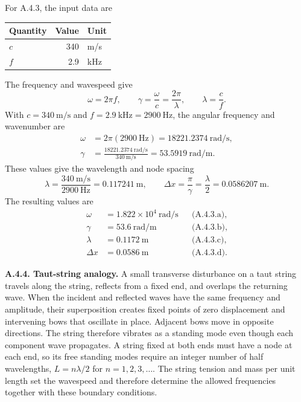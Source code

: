 For A.4.3, the input data are
\begin{center}\small
\begin{tabular}{@{}lrl@{}}
\toprule\noalign{}
Quantity & Value & Unit \\
\midrule\noalign{}
$c$ & 340 & m/s \\
$f$ & 2.9 & kHz \\
\bottomrule
\end{tabular}
\end{center}
The frequency and wavespeed give
\[
\omega=2\pi f,\qquad \gamma=\frac{\omega}{c}=\frac{2\pi}{\lambda},\qquad \lambda=\frac{c}{f}.
\]
With $c=340\ \mathrm{m/s}$ and $f=2.9\ \mathrm{kHz}=2900\ \mathrm{Hz}$, the angular frequency and wavenumber are
\[
\begin{aligned}
\omega&=2\pi(2900\ \mathrm{Hz})=18221.2374\ \mathrm{rad/s},\\
\gamma&=\frac{18221.2374\ \mathrm{rad/s}}{340\ \mathrm{m/s}}=53.5919\ \mathrm{rad/m}.
\end{aligned}
\]
These values give the wavelength and node spacing
\[
\lambda=\frac{340\ \mathrm{m/s}}{2900\ \mathrm{Hz}}=0.117241\ \mathrm{m},\qquad
\Delta x=\frac{\pi}{\gamma}=\frac{\lambda}{2}=0.0586207\ \mathrm{m}.
\]
The resulting values are
\[\boxed{\begin{aligned}
\omega&=1.822\times10^4\ \mathrm{rad/s} &&\text{(A.4.3.a)},\\
\gamma&=53.6\ \mathrm{rad/m} &&\text{(A.4.3.b)},\\
\lambda&=0.1172\ \mathrm{m} &&\text{(A.4.3.c)},\\
\Delta x&=0.0586\ \mathrm{m} &&\text{(A.4.3.d)}.
\end{aligned}}\]

\textbf{A.4.4. Taut-string analogy.} A small transverse disturbance on a taut string travels along the string, reflects from a fixed end, and overlaps the returning wave. When the incident and reflected waves have the same frequency and amplitude, their superposition creates fixed points of zero displacement and intervening bows that oscillate in place. Adjacent bows move in opposite directions. The string therefore vibrates as a standing mode even though each component wave propagates. A string fixed at both ends must have a node at each end, so its free standing modes require an integer number of half wavelengths, $L=n\lambda/2$ for $n=1,2,3,\ldots$. The string tension and mass per unit length set the wavespeed and therefore determine the allowed frequencies together with these boundary conditions.

\clearpage
{}


